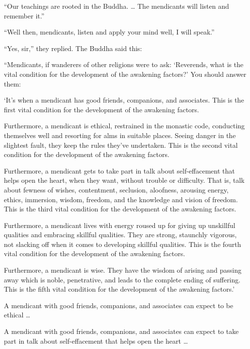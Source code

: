 \documentclass[12pt,openany]{book}%
\begin{document}
“Our teachings are rooted in the Buddha. … The mendicants will listen and remember it.” 

“Well then, mendicants, listen and apply your mind well, I will speak.” 

“Yes, sir,” they replied. The Buddha said this: 

“Mendicants, if wanderers of other religions were to ask: ‘Reverends, what is the vital condition for the development of the awakening factors?’ You should answer them: 

‘It’s when a mendicant has good friends, companions, and associates. This is the first vital condition for the development of the awakening factors. 

Furthermore, a mendicant is ethical, restrained in the monastic code, conducting themselves well and resorting for alms in suitable places. Seeing danger in the slightest fault, they keep the rules they’ve undertaken. This is the second vital condition for the development of the awakening factors. 

Furthermore, a mendicant gets to take part in talk about self-effacement that helps open the heart, when they want, without trouble or difficulty. That is, talk about fewness of wishes, contentment, seclusion, aloofness, arousing energy, ethics, immersion, wisdom, freedom, and the knowledge and vision of freedom. This is the third vital condition for the development of the awakening factors. 

Furthermore, a mendicant lives with energy roused up for giving up unskillful qualities and embracing skillful qualities. They are strong, staunchly vigorous, not slacking off when it comes to developing skillful qualities. This is the fourth vital condition for the development of the awakening factors. 

Furthermore, a mendicant is wise. They have the wisdom of arising and passing away which is noble, penetrative, and leads to the complete ending of suffering. This is the fifth vital condition for the development of the awakening factors.’ 

A mendicant with good friends, companions, and associates can expect to be ethical … 

A mendicant with good friends, companions, and associates can expect to take part in talk about self-effacement that helps open the heart … 
\end{document}
